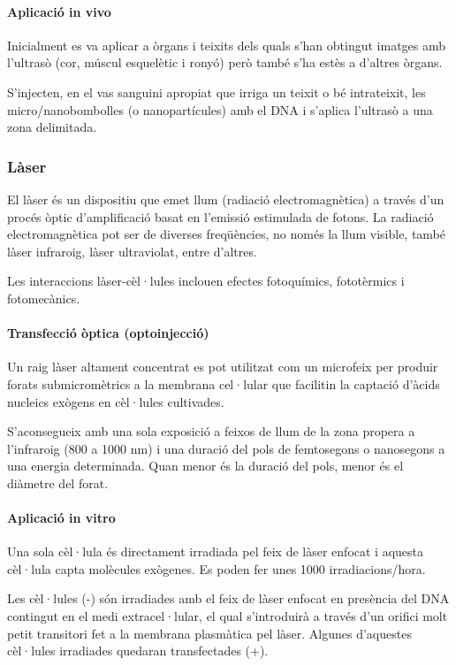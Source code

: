 \paragraph{Aplicació in vivo}
Inicialment es va aplicar a òrgans i teixits dels quals s'han obtingut imatges amb l'ultrasò (cor, múscul esquelètic i ronyó) però també s'ha estès a d'altres òrgans.

S'injecten, en el vas sanguini apropiat que irriga un teixit o bé intrateixit, les micro/nanobombolles (o nanopartícules) amb el DNA i s'aplica l'ultrasò a una zona delimitada.

\subsubsection{Làser}
\label{sec:laser}

El làser és un dispositiu que emet llum (radiació electromagnètica) a través d'un procés òptic d'amplificació basat en l'emissió estimulada de fotons. La radiació electromagnètica pot ser de diverses freqüències, no només la llum visible, també làser infraroig, làser ultraviolat, entre d'altres.

Les interaccions làser-cèl·lules inclouen efectes fotoquímics, fototèrmics i fotomecànics.

\paragraph{Transfecció òptica (optoinjecció)}
Un raig làser altament concentrat es pot utilitzat com un microfeix per produir forats submicromètrics a la membrana cel·lular que facilitin la captació d'àcids nucleics exògens en cèl·lules cultivades.

S'aconsegueix amb una sola exposició a feixos de llum de la zona propera a l'infraroig (800 a 1000 nm) i una duració del pols de femtosegons o nanosegons a una energia determinada. Quan menor és la duració del pols, menor és el diàmetre del forat.

\paragraph{Aplicació in vitro}
Una sola cèl·lula és directament irradiada pel feix de làser enfocat i aquesta cèl·lula capta molècules exògenes. Es poden fer unes 1000 irradiacions/hora.

Les cèl·lules (-) són irradiades amb el feix de làser enfocat en presència del DNA contingut en el medi extracel·lular, el qual s'introduirà a través d'un orifici molt petit transitori fet a la membrana plasmàtica pel làser. Algunes d'aquestes cèl·lules irradiades quedaran transfectades (+).
